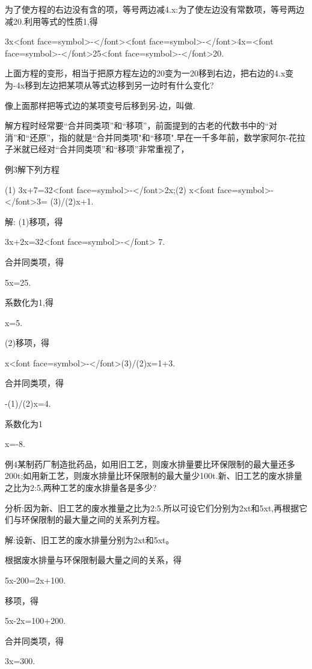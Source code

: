      为了使方程的右边没有含的项，等号两边减4.x:为了使左边没有常数项，等号两边减20.利用等式的性质1,得

     3x<font face=symbol>-</font><font face=symbol>-</font>4x=<font face=symbol>-</font>25<font face=symbol>-</font>20.

     上面方程的变形，相当于把原方程左边的20变为一20移到右边，把右边的4.x变为-4x移到左边把某项从等式边移到另一边时有什么变化?

     像上面那样把等式边的某项变号后移到另-边，叫做\enddefination.
    \endexample

    解方程时经常要“合并同类项”和“移项”，前面提到的古老的代数书中的“对消”和“还原”，指的就是“合并同类项"和“移项".早在一千多年前，数学家阿尔-花拉子米就已经对“合并同类项”和“移项”非常重视了，
    \beginexample

    例3解下列方程

    (1) 3x+7=32<font face=symbol>-</font>2x;(2) x<font face=symbol>-</font>3= (3)/(2)x+1.

    解: (1)移项，得

    3x+2x=32<font face=symbol>-</font> 7.

    合并同类项，得

    5x=25.

    系数化为1,得

    x=5.

    (2)移项，得

    x<font face=symbol>-</font>(3)/(2)x=1+3.

    合并同类项，得

    -(1)/(2)x=4.

    系数化为1

    x=-8.

    例4某制药厂制造批药品，如用旧工艺，则废水排量要比环保限制的最大量还多200t;如用新工艺，则废水排量比环保限制的最大量少100t.新、旧工艺的废水排量之比为2:5,两种工艺的废水排量各是多少?

    分析:因为新、旧工艺的废水推量之比为2:5.所以可设它们分别为2xt和5xt,再根据它们与环保限制的最大量之间的关系列方程。

    解:设新、旧工艺的废水排量分别为2xt和5xt。

    根据废水排量与环保限制最大量之间的关系，得

    5x-200=2x+100.

    移项，得

    5x-2x=100+200.

    合并同类项，得

    3x=300.

